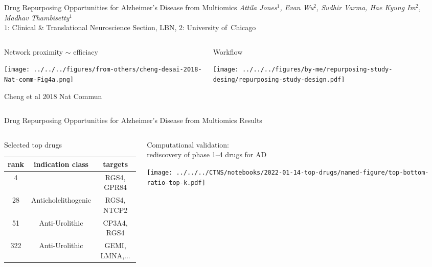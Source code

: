 \documentclass[aspectratio=169]{beamer}
\subtitle{A subtitle may be shorter and more technical}
\author{poster \#1}
\date{Attila Jones}
\begin{document}
\begin{frame}{Drug Repurposing Opportunities for Alzheimer’s Disease from
	Multiomics}
	{\emph{Attila Jones$^1$, Evan Wu$^2$, Sudhir Varma, Hae Kyung Im$^2$, Madhav Thambisetty$^1$}\\
		$1$: Clinical \& Translational Neuroscience Section, LBN, $2$: University
	of~Chicago}

\begin{columns}[t]
\begin{column}{0.35\textwidth}
\begin{center}
	Network proximity $\sim$
	efficiacy
\end{center}

\texttt{[image: ../../../figures/from-others/cheng-desai-2018-Nat-comm-Fig4a.png]}

\tiny
Cheng et al 2018 Nat Commun
\end{column}

\begin{column}{0.7\textwidth}
\begin{center}
	Workflow
\end{center}

\texttt{[image: ../../../figures/by-me/repurposing-study-desing/repurposing-study-design.pdf]}
\end{column}
\end{columns}
\end{frame}

\begin{frame}{Drug Repurposing Opportunities for Alzheimer’s Disease from
	Multiomics}
	{Results}

\begin{columns}[t]
\begin{column}{0.5\textwidth}
\begin{center}
	Selected top drugs
\end{center}
\footnotesize
\begin{tabular}{ccc}
	rank & indication class    & targets \\
	\hline
	4    &                     & RGS4, GPR84 \\
	28   & Anticholelithogenic & RGS4, NTCP2 \\
	51   & Anti-Urolithic      & CP3A4, RGS4 \\
	322  & Anti-Urolithic      & GEMI, LMNA,... \\
\end{tabular}
\end{column}

\begin{column}{0.5\textwidth}
\begin{center}
	Computational validation:\\
	rediscovery of phase 1--4 drugs for AD
\end{center}

\texttt{[image: ../../../CTNS/notebooks/2022-01-14-top-drugs/named-figure/top-bottom-ratio-top-k.pdf]}
\end{column}
\end{columns}
\end{frame}
\end{document}
